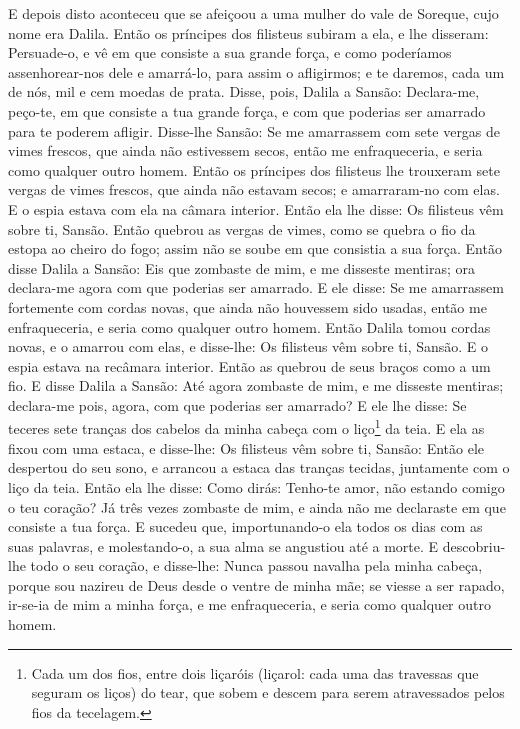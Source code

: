E depois disto aconteceu que se afeiçoou a uma mulher do vale de
Soreque, cujo nome era Dalila. Então os príncipes dos filisteus
subiram a ela, e lhe disseram: Persuade-o, e vê em que consiste a
sua grande força, e como poderíamos assenhorear-nos dele e
amarrá-lo, para assim o afligirmos; e te daremos, cada um de nós,
mil e cem moedas de prata. Disse, pois, Dalila a Sansão:
Declara-me, peço-te, em que consiste a tua grande força, e com que
poderias ser amarrado para te poderem afligir. Disse-lhe Sansão:
Se me amarrassem com sete vergas de vimes frescos, que ainda não
estivessem secos, então me enfraqueceria, e seria como qualquer
outro homem. Então os príncipes dos filisteus lhe trouxeram sete
vergas de vimes frescos, que ainda não estavam secos; e amarraram-no
com elas. E o espia estava com ela na câmara interior. Então ela
lhe disse: Os filisteus vêm sobre ti, Sansão. Então quebrou as
vergas de vimes, como se quebra o fio da estopa ao cheiro do fogo;
assim não se soube em que consistia a sua força. Então disse
Dalila a Sansão: Eis que zombaste de mim, e me disseste mentiras;
ora declara-me agora com que poderias ser amarrado. E ele
disse: Se me amarrassem fortemente com cordas novas, que ainda não
houvessem sido usadas, então me enfraqueceria, e seria como qualquer
outro homem. Então Dalila tomou cordas novas, e o amarrou com
elas, e disse-lhe: Os filisteus vêm sobre ti, Sansão. E o espia
estava na recâmara interior. Então as quebrou de seus braços como a
um fio. E disse Dalila a Sansão: Até agora zombaste de mim, e
me disseste mentiras; declara-me pois, agora, com que poderias ser
amarrado? E ele lhe disse: Se teceres sete tranças dos cabelos da
minha cabeça com o liço\footnote{Cada um dos fios, entre dois
liçaróis (liçarol: cada uma das travessas que seguram os liços) do
tear, que sobem e descem para serem atravessados pelos fios da
tecelagem.} da teia. E ela as fixou com uma estaca, e
disse-lhe: Os filisteus vêm sobre ti, Sansão: Então ele despertou do
seu sono, e arrancou a estaca das tranças tecidas, juntamente com o
liço da teia. Então ela lhe disse: Como dirás: Tenho-te amor,
não estando comigo o teu coração? Já três vezes zombaste de mim, e
ainda não me declaraste em que consiste a tua força. E
sucedeu que, importunando-o ela todos os dias com as suas palavras,
e molestando-o, a sua alma se angustiou até a morte. E
descobriu-lhe todo o seu coração, e disse-lhe: Nunca passou navalha
pela minha cabeça, porque sou nazireu de Deus desde o ventre de
minha mãe; se viesse a ser rapado, ir-se-ia de mim a minha força, e
me enfraqueceria, e seria como qualquer outro homem.

